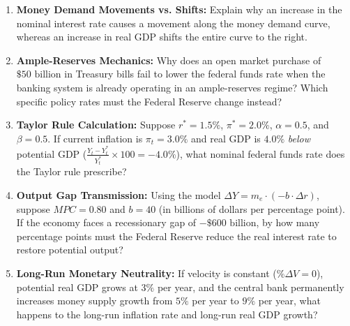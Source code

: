 \documentclass[11pt, a4paper]{article}
\begin{document}
\begin{enumerate}[leftmargin=1.4em, itemsep=0.45em]
  \item \textbf{Money Demand Movements vs. Shifts:} Explain why an increase in the nominal interest rate causes a movement along the money demand curve, whereas an increase in real GDP shifts the entire curve to the right.
  \item \textbf{Ample-Reserves Mechanics:} Why does an open market purchase of $\$50\text{ billion}$ in Treasury bills fail to lower the federal funds rate when the banking system is already operating in an ample-reserves regime? Which specific policy rates must the Federal Reserve change instead?
  \item \textbf{Taylor Rule Calculation:} Suppose $r^* = 1.5\%$, $\pi^* = 2.0\%$, $\alpha = 0.5$, and $\beta = 0.5$. If current inflation is $\pi_t = 3.0\%$ and real GDP is $4.0\%$ \emph{below} potential GDP ($\frac{Y_t - Y_t^*}{Y_t^*} \times 100 = -4.0\%$), what nominal federal funds rate does the Taylor rule prescribe?
  \item \textbf{Output Gap Transmission:} Using the model $\Delta Y = m_e \cdot (-b \cdot \Delta r)$, suppose $MPC = 0.80$ and $b = 40$ (in billions of dollars per percentage point). If the economy faces a recessionary gap of $-\$600\text{ billion}$, by how many percentage points must the Federal Reserve reduce the real interest rate to restore potential output?
  \item \textbf{Long-Run Monetary Neutrality:} If velocity is constant ($\%\Delta V = 0$), potential real GDP grows at $3\%$ per year, and the central bank permanently increases money supply growth from $5\%$ per year to $9\%$ per year, what happens to the long-run inflation rate and long-run real GDP growth?
\end{enumerate}
\end{document}
